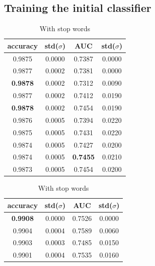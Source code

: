 \subsection{Training the initial classifier}

\begin{table}
  \begin{subtable}{.5\linewidth}
    \centering
    \begin{tabular}{cccc} \toprule
      accuracy        & std($\sigma$) & AUC             & std($\sigma$) \\ \midrule
      0.9875          & 0.0000        & 0.7387          & 0.0000 \\
      0.9877          & 0.0002        & 0.7381          & 0.0000 \\
      \textbf{0.9878} & 0.0002        & 0.7312          & 0.0090 \\
      0.9877          & 0.0002        & 0.7412          & 0.0190 \\
      \textbf{0.9878} & 0.0002        & 0.7454          & 0.0190 \\ \midrule
      0.9876          & 0.0005        & 0.7394          & 0.0220 \\
      0.9875          & 0.0005        & 0.7431          & 0.0220 \\
      0.9874          & 0.0005        & 0.7427          & 0.0200 \\
      0.9874          & 0.0005        & \textbf{0.7455} & 0.0210 \\
      0.9873          & 0.0005        & 0.7454          & 0.0200 \\ \bottomrule
    \end{tabular}
      \caption{With stop words}
      \label{tab:data-with-stopwords}
  \end{subtable}
  \begin{subtable}{.5\linewidth}
    \centering
    \begin{tabular}{cccc} \toprule
      accuracy        & std($\sigma$) & AUC             & std($\sigma$) \\ \midrule
      \textbf{0.9908} & 0.0000        & 0.7526          & 0.0000 \\
      0.9904          & 0.0004        & 0.7589          & 0.0060 \\
      0.9903          & 0.0003        & 0.7485          & 0.0150 \\
      0.9901          & 0.0004        & 0.7535          & 0.0160 \\

\end{tabular}
\end{subtable}
\end{table}
